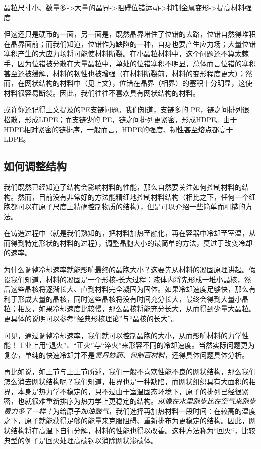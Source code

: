 晶粒尺寸小、数量多->大量的晶界->阻碍位错运动->抑制金属变形->提高材料强度

但这还只是硬币的一面，另一面是，既然晶界堵住了位错的去路，位错自然得堆积在晶界面前；而我们知道，位错作为缺陷的一种，自身也要产生应力场；大量位错塞积产生的大应力场将可能使材料断裂。在小晶粒材料中，这个问题还不算太棘手，因为位错被分散在大量晶粒中，单处的位错塞积不明显，总体而言位错的塞积甚至还被缓解，材料的韧性也被增强（在材料断裂前，材料的变形程度更大）；然而，在网状结构的材料中（见上文），位错在晶界（相界）的塞积十分明显，这使材料很容易断裂。因此，我们往往不喜欢具有网状结构的材料。

或许你还记得上文提及的PE支链问题。我们知道，支链多的 PE，链之间排列很松散，形成LDPE；而支链少的 PE，链之间排列更紧密，形成HDPE。由于HDPE相对紧密的链排序，一般而言，HDPE的强度、韧性甚至熔点都高于LDPE。

\subsection{如何调整结构}

我们既然已经知道了结构会影响材料的性能，那么自然要关注如何控制材料的结构。然而，目前没有非常好的方法能精细地控制材料结构（相比之下，任何一个细胞都可以在原子尺度上精确控制物质的结构），但是可以介绍一些简单而粗糙的方法。

在铸造过程中（就是我们熟知的，把材料加热至融化，再在容器中冷却至室温，从而得到特定形状的材料的过程），调整晶胞大小的最简单的方法，莫过于改变冷却的速率。

为什么调整冷却速率就能影响最终的晶胞大小？这要先从材料的凝固原理讲起。假设我们知道，材料的凝固是一个形核-长大过程：液体内将先形成一堆小晶核，然后这些晶核将逐渐长大、直到材料完全凝固为固体。如果冷却速度足够快，那么有利于形成大量的晶核，同时这些晶核将没有时间充分长大，最终会得到大量小晶粒；相反，如果冷却速度比较慢，那么晶核将能充分长大，从而得到少量大晶粒。更具体的说明可以参考“经典形核理论”与“晶核的长大”。

可见，通过调整冷却速率，我们就可以控制晶胞的大小，从而影响材料的力学性能！工业上用“退火”、“正火”与“淬火”来形容不同的冷却速度。当然实际问题更为复杂，单纯的快速冷却并不是\textsl{灵丹妙药、包制百材料}，还得具体问题具体分析。

再比如说，如上节与上上节所述，我们一般不喜欢性能不良的网状结构，那么我们怎么消去网状结构呢？我们知道，相界也是一种缺陷，而网状组织具有大面积的相界，本身是热力学不稳定的，只不过由于室温固态环境下，原子的排列已经很紧密，也就很难重新排序为热力学上更稳定的结构。\textsl{就像在水里跑步比在空气来跑步费力多了一样！}为给原子\textsl{加油鼓气}，我们选择再加热材料一段时间：在较高的温度之下，原子就能获得足够的能量来克服阻碍、重新排布为更稳定的结构。因此，网状结构将在高温下自行分解，材料的性能也得以改善。这种方法称为“回火“，比较典型的例子是回火处理高碳钢以消除网状渗碳体。

